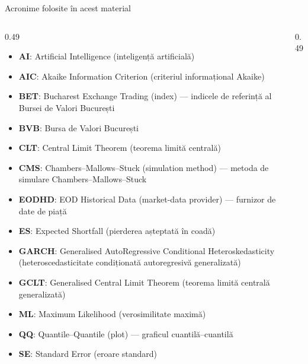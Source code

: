 {
\begin{frame}[noframenumbering]
    \titlepage
\end{frame}
}
\begin{frame}{Acronime folosite în acest material}
\begin{columns}[T]
\begin{column}{0.49\textwidth}
\begin{itemize}\setlength{\itemsep}{0pt}
    \item \textbf{AI}: Artificial Intelligence (inteligență artificială)
    \item \textbf{AIC}: Akaike Information Criterion (criteriul informațional Akaike)
    \item \textbf{BET}: Bucharest Exchange Trading (index) — indicele de referință al Bursei de Valori București
    \item \textbf{BVB}: Bursa de Valori București
    \item \textbf{CLT}: Central Limit Theorem (teorema limită centrală)
    \item \textbf{CMS}: Chambers–Mallows–Stuck (simulation method) — metoda de simulare Chambers–Mallows–Stuck
    \item \textbf{EODHD}: EOD Historical Data (market-data provider) — furnizor de date de piață
    \item \textbf{ES}: Expected Shortfall (pierderea așteptată în coadă)
    \item \textbf{GARCH}: Generalised AutoRegressive Conditional Heteroskedasticity (heteroscedasticitate condiționată autoregresivă generalizată)
    \item \textbf{GCLT}: Generalised Central Limit Theorem (teorema limită centrală generalizată)
    \item \textbf{ML}: Maximum Likelihood (verosimilitate maximă)
    \item \textbf{QQ}: Quantile–Quantile (plot) — graficul cuantilă–cuantilă
    \item \textbf{SE}: Standard Error (eroare standard)
\end{itemize}
\end{column}
\begin{column}{0.49\textwidth}
\end{column}
\end{columns}
\end{frame}

